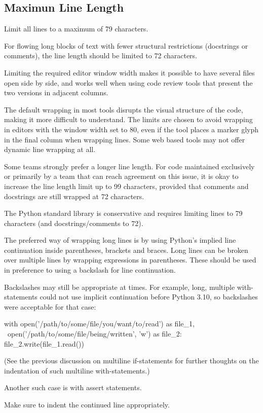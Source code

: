 \documentclass[a4paper,11pt]{article}
\begin{document}
\subsection{Maximun Line Length}
Limit all lines to a maximum of 79 characters.
\par
For flowing long blocks of text with fewer structural restrictions (docstrings
or comments), the line length should be limited to 72 characters.
\par
Limiting the required editor window width makes it possible to have several
files open side by side, and works well when using code review tools that
present the two versions in adjacent columns.
\par
The default wrapping in most tools disrupts the visual structure of the code,
making it more difficult to understand. The limits are chosen to avoid wrapping
in editors with the window width set to 80, even if the tool places a marker
glyph in the final column when wrapping lines. Some web based tools may not
offer dynamic line wrapping at all.
\par
Some teams strongly prefer a longer line length. For code maintained exclusively
or primarily by a team that can reach agreement on this issue, it is okay to
increase the line length limit up to 99 characters, provided that comments and
docstrings are still wrapped at 72 characters.
\par
The Python standard library is conservative and requires limiting lines to 79
characters (and docstrings/comments to 72).
\par
The preferred way of wrapping long lines is by using Python’s implied line
continuation inside parentheses, brackets and braces. Long lines can be broken
over multiple lines by wrapping expressions in parentheses. These should be used
in preference to using a backslash for line continuation.
\par
Backslashes may still be appropriate at times. For example, long, multiple
with-statements could not use implicit continuation before Python 3.10, so
backslashes were acceptable for that case:
\par
\begin{python}
with open('/path/to/some/file/you/want/to/read') as file_1, \
     open('/path/to/some/file/being/written', 'w') as file_2:
    file_2.write(file_1.read())
\end{python}
(See the previous discussion on multiline if-statements for further thoughts on
the indentation of such multiline with-statements.)
\par
Another such case is with assert statements.
\par
Make sure to indent the continued line appropriately.
\par
\end{document}
